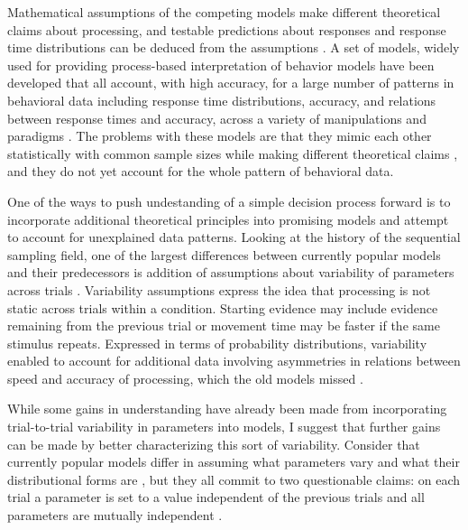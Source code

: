 \documentclass[12pt]{report}
\begin{document}
Mathematical assumptions of the competing models make different theoretical claims about processing, and testable predictions about responses and response time distributions can be deduced from the assumptions \citep{Vic1979,Coo1983,Luc1986}. A set of models, widely used for providing process-based interpretation of behavior \citep{RatMck2008,DonBro2011,HeaHay2012} models have been developed that all account, with high accuracy, for a large number of patterns in behavioral data including response time distributions, accuracy, and relations between response times and accuracy, across a variety of manipulations and paradigms \citep{UshMcc2001,RatTue2002,BroHea2008}. The problems with these models are that they mimic each other statistically with common sample sizes while making different theoretical claims \citep{ZanCol2000,RatSmi2004,DonBro2011}, and they do not yet account for the whole pattern of behavioral data.

One of the ways to push undestanding of a simple decision process forward is to incorporate additional theoretical principles into promising models and attempt to account for unexplained data patterns. Looking at the history of the sequential sampling field, one of the largest differences between currently popular models and their predecessors is addition of assumptions about variability of parameters across trials \citep{Lam1968,Vic1979,RatSmi2004}. Variability assumptions express the idea that processing is not static across trials within a condition. Starting evidence may include evidence remaining from the previous trial or movement time may be faster if the same stimulus repeats. Expressed in terms of probability distributions, variability enabled to account for additional data involving asymmetries in relations between speed and accuracy of processing, which the old models missed \citep{Luc1986, RatSmi2004}. 

While some gains in understanding have already been made from incorporating trial-to-trial variability in parameters into models, I suggest that further gains can be made by better characterizing this sort of variability. Consider that currently popular models differ in assuming what parameters vary and what their distributional forms are \citep{JonDzh2014}, but they all commit to two questionable claims: on each trial a parameter is set to a value independent of the previous trials and all parameters are mutually independent \citep{UshMcc2001,RatTue2002,BroHea2008}.
\end{document}
